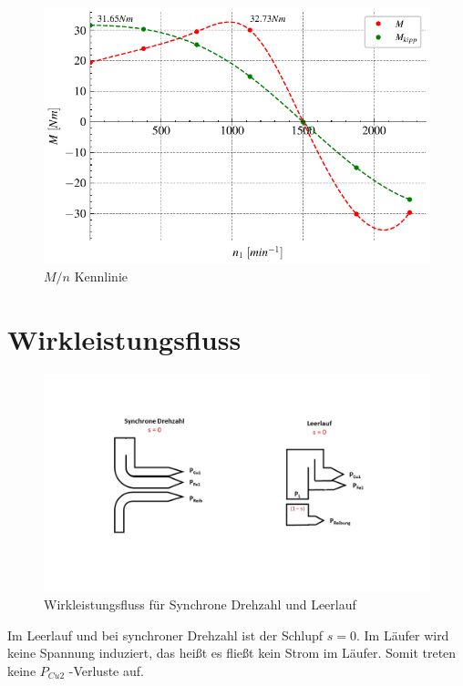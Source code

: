 \documentclass[conference]{IEEEtran}
\begin{document}
\begin{figure}[htbp]
    \centering
    \includegraphics[width=\columnwidth]{./figures/m_n-kennlinie.pdf}
    \caption{$M/n$ Kennlinie}
    \label{fig:m_n-kennlinie}
\end{figure}


\section{Wirkleistungsfluss}

\begin{figure}[htbp]
    \centering
    \includegraphics[width=\columnwidth]{./figures/Wirkleistungsfluss.jpg}
    \caption{Wirkleistungsfluss für Synchrone Drehzahl und Leerlauf}
\end{figure}

Im Leerlauf und bei synchroner Drehzahl ist der Schlupf $s=0$. Im Läufer wird
keine Spannung induziert, das heißt es fließt kein Strom im Läufer. Somit
treten keine $P_{Cu2}$ -Verluste auf.
\end{document}
